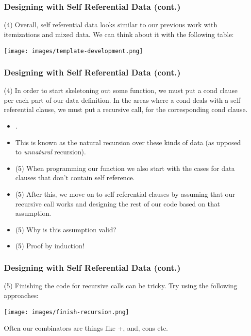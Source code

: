 \documentclass{beamer}
\begin{document}

\begin{frame}
  \frametitle{Designing with Self Referential Data (cont.)}
  (4) Overall, self referential data looks similar to our previous work with itemizations and mixed data. We can think about it with the
  following table:
  \begin{center}
    \texttt{[image: images/template-development.png]}
  \end{center}
\end{frame}



\begin{frame}
  \frametitle{Designing with Self Referential Data (cont.)}
  (4) In order to start skeletoning out some function, we must put a cond clause per each part of our data definition. In the areas where a cond deals with a self referential clause, we must put a recursive call, for the corresponding cond clause.
  \begin{itemize}
  \item<2-> \naturalRecursion.
  \item<3-> This is known as the natural recursion over these kinds of data (as upposed to \emph{unnatural} recursion).
  \item<4-> (5) When programming our function we also start with the cases for data clauses that don't contain self reference.
  \item<5-> (5) After this, we move on to self referential clauses by assuming that our recursive call works and designing the rest of our code based on that assumption.
  \item<6-> (5) Why is this assumption valid?
  \item<7-> (5) Proof by induction!
  \end{itemize}
\end{frame}

\begin{frame}
  \frametitle{Designing with Self Referential Data (cont.)}
  (5) Finishing the code for recursive calls can be tricky. Try using the following approaches:
  \begin{center}
    \texttt{[image: images/finish-recursion.png]}

  \end{center}
  Often our combinators are things like +, and, cons etc.
\end{frame}
 
\end{document}
